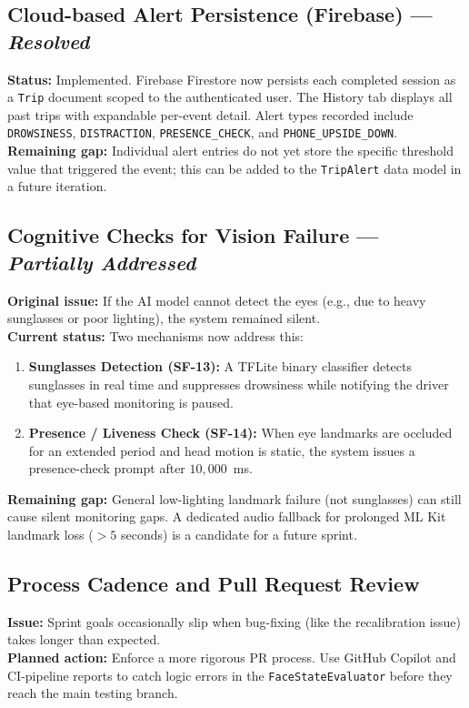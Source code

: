\documentclass[11pt]{report}
\begin{document}
\subsection{Cloud-based Alert Persistence (Firebase) — \textit{Resolved}}
\textbf{Status:} Implemented. Firebase Firestore now persists each completed session as a \texttt{Trip} document scoped to the authenticated user. The History tab displays all past trips with expandable per-event detail. Alert types recorded include \texttt{DROWSINESS}, \texttt{DISTRACTION}, \texttt{PRESENCE\_CHECK}, and \texttt{PHONE\_UPSIDE\_DOWN}. \textbf{Remaining gap:} Individual alert entries do not yet store the specific threshold value that triggered the event; this can be added to the \texttt{TripAlert} data model in a future iteration.

\subsection{Cognitive Checks for Vision Failure — \textit{Partially Addressed}}
\textbf{Original issue:} If the AI model cannot detect the eyes (e.g., due to heavy sunglasses or poor lighting), the system remained silent.\\
\textbf{Current status:} Two mechanisms now address this:
\begin{enumerate}
    \item \textbf{Sunglasses Detection (SF-13):} A TFLite binary classifier detects sunglasses in real time and suppresses drowsiness while notifying the driver that eye-based monitoring is paused.
    \item \textbf{Presence / Liveness Check (SF-14):} When eye landmarks are occluded for an extended period and head motion is static, the system issues a presence-check prompt after $10{,}000$~ms.
\end{enumerate}
\textbf{Remaining gap:} General low-lighting landmark failure (not sunglasses) can still cause silent monitoring gaps. A dedicated audio fallback for prolonged ML Kit landmark loss ($>5$ seconds) is a candidate for a future sprint.

\subsection{Process Cadence and Pull Request Review}
\textbf{Issue:} Sprint goals occasionally slip when bug-fixing (like the recalibration issue) takes longer than expected.\\
\textbf{Planned action:} Enforce a more rigorous PR process. Use GitHub Copilot and CI-pipeline reports to catch logic errors in the \texttt{FaceStateEvaluator} before they reach the main testing branch.
\end{document}
